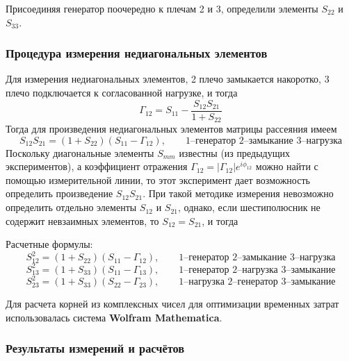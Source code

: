 \documentclass[a4paper,12pt]{article}
\begin{document}
Присоединяя генератор поочередно к плечам 2 и 3, определили элементы $S_{22}$ и $S_{33}$.

\subsubsection{Процедура измерения недиагональных элементов}

Для измерения недиагональных элементов, 2 плечо замыкается накоротко, 3 плечо подключается к согласованной нагрузке, и тогда
\begin{equation}
	\Gamma _ { 12 } = S _ { 11 } - \frac { S _ { 12 } S _ { 21 } } { 1 + S _ { 22 } }
\end{equation}
Тогда для произведения недиагональных элементов матрицы рассеяния имеем
\begin{equation}
	S _ { 12 } S _ { 21 } = \left( 1 + S _ { 22 } \right) \left( S _ { 11 } - \Gamma _ { 12 } \right),\qquad\text{1--генератор 2--замыкание 3--нагрузка}
\end{equation}
Поскольку диагональные элементы $S_{mm}$ известны (из предыдущих экспериментов), а коэффициент отражения $\Gamma_{12}=|\Gamma_{12}|e^{i\phi_{12}}$ можно найти с помощью измерительной линии, то этот эксперимент дает возможность определить произведение $S_{12}S_{21}$.
При такой методике измерения невозможно определить отдельно элементы $S_{12}$ и $S_{21}$, однако, если шестиполюсник не содержит невзаимных элементов, то $S_{12} = S_{21}$, и тогда

Расчетные формулы:
\begin{equation}
	S _ { 12 }^2 = \left( 1 + S _ { 22 } \right) \left( S _ { 11 } - \Gamma _ { 12 } \right),\qquad\text{1--генератор 2--замыкание 3--нагрузка}
\end{equation}
\begin{equation}
	S _ { 13 } ^ { 2 } = \left( 1 + S _ { 33 } \right) \left( S _ { 11 } - \Gamma _ { 13 } \right),\qquad\text{1--генератор 2--нагрузка 3--замыкание}
\end{equation}
\begin{equation}
	S _ { 23 } ^ { 2 } = \left( 1 + S _ { 33 } \right) \left( S _ { 22 } - \Gamma _ { 23 } \right),\qquad\text{1--нагрузка 2--генератор 3--замыкание}
\end{equation}

Для расчета корней из комплексных чисел для оптимизации временных затрат использовалась система \textbf{Wolfram Mathematica}.

\newpage
\subsubsection{Результаты измерений и расчётов}
\end{document}
